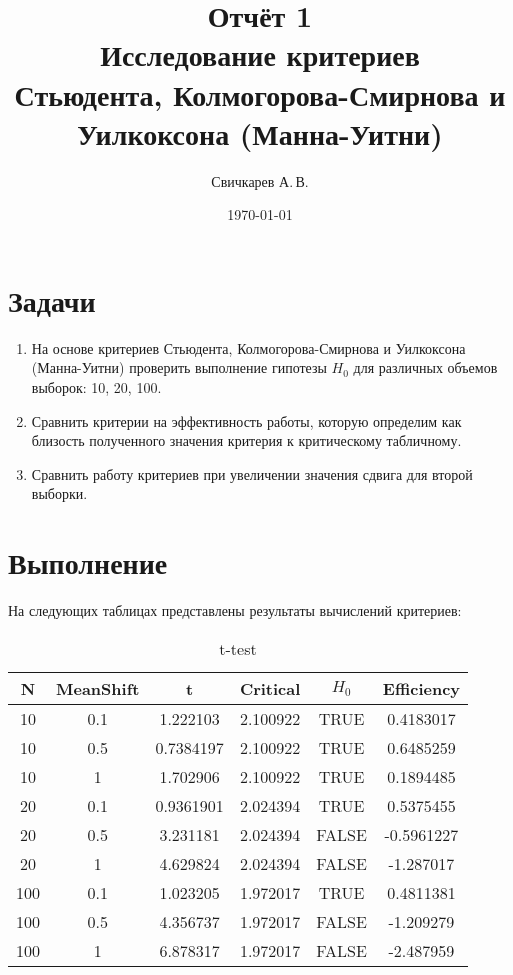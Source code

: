 \documentclass{article} %
\title{Отчёт 1\\
Исследование критериев\\
Стьюдента, Колмогорова-Смирнова
и Уилкоксона (Манна-Уитни)} %
\author{Свичкарев А.\,В.} %
\date{\today} %
\begin{document}

\maketitle %

\section*{Задачи}
\begin{enumerate}
    \item На основе критериев Стьюдента,
        Колмогорова-Смирнова и Уилкоксона (Манна-Уитни)
        проверить выполнение гипотезы $H_0$
        для различных объемов выборок: 10, 20, 100. 
    \item Сравнить критерии на эффективность работы,
        которую определим как близость полученного значения критерия
        к критическому табличному.
    \item Сравнить работу критериев при увеличении значения сдвига
        для второй выборки.
\end{enumerate}

\section*{Выполнение}

На следующих таблицах представлены результаты вычислений критериев:

\begin{table}[H]
\centering
\begin{tabular}{|c|c|c|c|c|c|}
\hline
\textbf{N} & \textbf{MeanShift} & \textbf{t} &
\textbf{Critical} & \textbf{$H_0$} & \textbf{Efficiency} \\ \hline
10  & 0.1       & 1.222103  & 2.100922 & TRUE  & 0.4183017  \\ \hline
10  & 0.5       & 0.7384197 & 2.100922 & TRUE  & 0.6485259  \\ \hline
10  & 1         & 1.702906  & 2.100922 & TRUE  & 0.1894485  \\ \hline
20  & 0.1       & 0.9361901 & 2.024394 & TRUE  & 0.5375455  \\ \hline
20  & 0.5       & 3.231181  & 2.024394 & FALSE & -0.5961227 \\ \hline
20  & 1         & 4.629824  & 2.024394 & FALSE & -1.287017  \\ \hline
100 & 0.1       & 1.023205  & 1.972017 & TRUE  & 0.4811381  \\ \hline
100 & 0.5       & 4.356737  & 1.972017 & FALSE & -1.209279  \\ \hline
100 & 1         & 6.878317  & 1.972017 & FALSE & -2.487959  \\ \hline
\end{tabular}
\caption{t-test}
\end{table}
\end{document}

